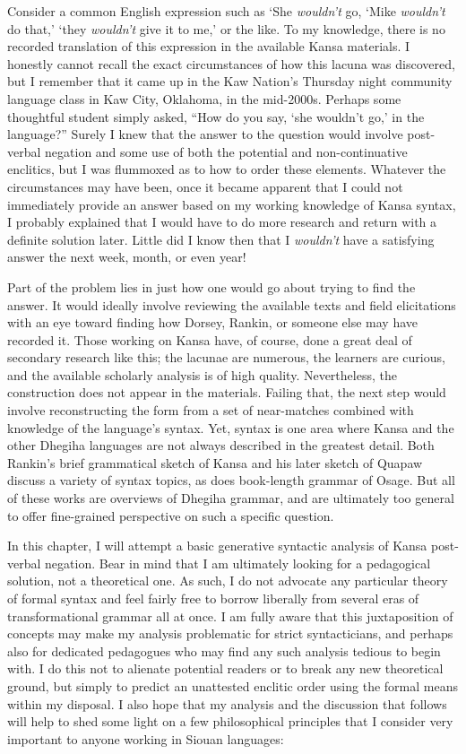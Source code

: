 \documentclass[output=paper]{LSP/langsci}
\begin{document}
Consider a common English expression such as `She \textit{wouldn't} go, `Mike \textit{wouldn't} do that,' `they \textit{wouldn't} give it to me,' or the like. To my knowledge, there is no recorded translation of this expression in the available Kansa materials. I honestly cannot recall the exact circumstances of how this lacuna was discovered, but I remember that it came up in the Kaw Nation's Thursday night community language class in Kaw City, Oklahoma, in the mid-2000s. Perhaps some thoughtful student simply asked, ``How do you say, `she wouldn't go,' in the language?'' Surely I knew that the answer to the question would involve post-verbal negation and some use of both the potential and non-continuative enclitics, but I was flummoxed as to how to order these elements. Whatever the circumstances may have been, once it became apparent that I could not immediately provide an answer based on my working knowledge of Kansa syntax, I probably explained that I would have to do more research and return with a definite solution later. Little did I know then that I \textit{wouldn't} have a satisfying answer the next week, month, or even year!

Part of the problem lies in just how one would go about trying to find the answer. It would ideally involve reviewing the available texts and field elicitations with an eye toward finding how Dorsey, Rankin, or someone else may have recorded it. Those working on Kansa have, of course, done a great deal of secondary research like this; the lacunae are numerous, the learners are curious, and the available scholarly analysis is of high quality. Nevertheless, the construction does not appear in the materials. Failing that, the next step would involve reconstructing the form from a set of near-matches combined with knowledge of the language's syntax. Yet, syntax is one area where Kansa and the other Dhegiha languages are not always described in the greatest detail. Both Rankin's brief grammatical sketch of Kansa \citeyear{Rankin1989} and his later sketch of Quapaw \citeyear{Rankin2005b} discuss a variety of syntax topics, as does  book-length grammar of Osage. But all of these works are overviews of Dhegiha grammar, and are ultimately too general to offer fine-grained perspective on such a specific question. 

In this chapter, I will attempt a basic generative syntactic analysis of Kansa post-verbal negation. Bear in mind that I am ultimately looking for a pedagogical solution, not a theoretical one. As such, I do not advocate any particular theory of formal syntax and feel fairly free to borrow liberally from several eras of transformational grammar all at once. I am fully aware that this juxtaposition of concepts may make my analysis problematic for strict syntacticians, and perhaps also for dedicated pedagogues who may find any such analysis tedious to begin with. I do this not to alienate potential readers or to break any new theoretical ground, but simply to predict an unattested enclitic order using the formal means within my disposal. I also hope that my analysis and the discussion that follows will help to shed some light on a few philosophical principles that I consider very important to anyone working in Siouan languages:
\end{document}
